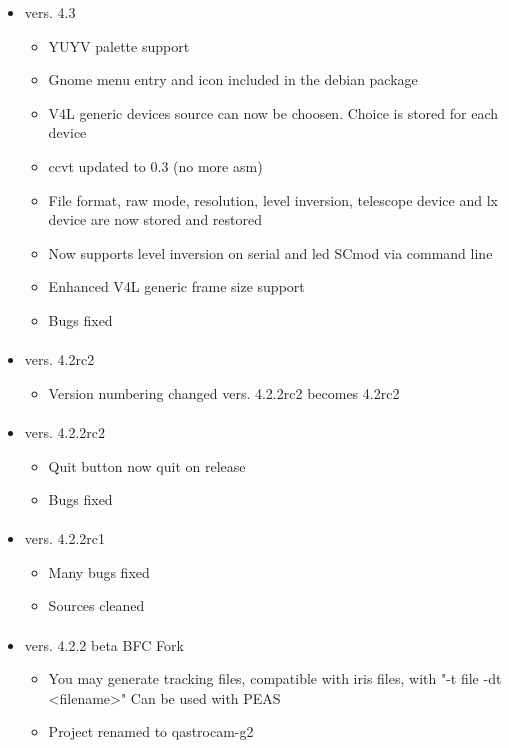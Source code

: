 \documentclass[11pt,a4paper]{book}
\begin{document}
\begin{itemize}
\paragraph*{}
\item vers. 4.3
\begin{itemize}
\item YUYV palette support
\item Gnome menu entry and icon included in the debian package
\item V4L generic devices source can now be choosen. Choice is stored for each device
\item ccvt updated to 0.3 (no more asm)
\item File format, raw mode, resolution, level inversion, telescope device and lx device 
 are now stored and restored
\item Now supports level inversion on serial and led SCmod via command line
\item Enhanced V4L generic frame size support
\item Bugs fixed
\end{itemize}
\paragraph*{}
\item vers. 4.2rc2
\begin{itemize}
\item Version numbering changed vers. 4.2.2rc2 becomes 4.2rc2
\end{itemize}
\paragraph*{}
\item vers. 4.2.2rc2
\begin{itemize}
\item Quit button now quit on release
\item Bugs fixed
\end{itemize}
\paragraph*{}
\item vers. 4.2.2rc1
\begin{itemize}
\item Many bugs fixed
\item Sources cleaned
\end{itemize}
\paragraph*{}
\item vers. 4.2.2 beta BFC Fork
\begin{itemize}
\item You may generate tracking files, compatible with iris files, with "-t file -dt <filename>"
  Can be used with PEAS
\item Project renamed to qastrocam-g2
\end{itemize}

\end{itemize}
\end{document}
